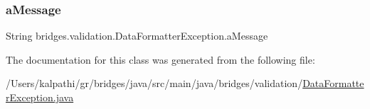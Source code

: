 \subsubsection{\texorpdfstring{aMessage}{aMessage}}
{\footnotesize\ttfamily String bridges.\+validation.\+Data\+Formatter\+Exception.\+a\+Message}



The documentation for this class was generated from the following file\+:\begin{DoxyCompactItemize}
\item 
/\+Users/kalpathi/gr/bridges/java/src/main/java/bridges/validation/\mbox{\hyperlink{_data_formatter_exception_8java}{Data\+Formatter\+Exception.\+java}}\end{DoxyCompactItemize}
